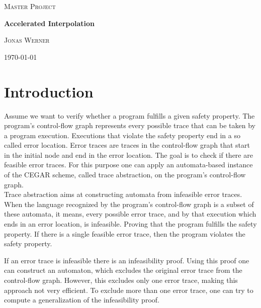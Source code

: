 \documentclass{article}
\begin{document}
	\newcommand{\HorizontalLine}{\rule{\linewidth}{0.3mm}}
	
		\begin{center}
		{\scshape\Large Master Project \par}
		\vspace{1.5cm}
		{\huge\bfseries Accelerated Interpolation \par}
		\vspace{1cm}
		{\large \scshape Jonas Werner\par}
		\vspace{0.5cm}
		{\today \vspace{2cm}} 
		
		\end{center}

\section{Introduction}
Assume we want to verify whether a program fulfills a given safety property. The program's control-flow graph represents every possible trace that can be taken by a program execution. Executions that violate the safety property end in a so called error location. Error traces are traces in the control-flow graph that start in the initial node and end in the error location. The goal is to check if there are feasible error traces.
For this purpose one can apply an automata-based instance of the CEGAR scheme, called trace abstraction, on the program's control-flow graph. \\

Trace abstraction aims at constructing automata \cite{10.1007/978-3-642-39799-8_2} from infeasible error traces. When the language recognized by the program's control-flow graph is a subset of these automata, it means, every possible error trace, and by that execution which ends in an error location, is infeasible. Proving that the program fulfills the safety property. If there is a single feasible error trace, then the program violates the safety property.\\
\par 
If an error trace is infeasible there is an infeasibility proof. Using this proof one can construct an automaton, which excludes the original error trace from the control-flow graph. However, this excludes only one error trace, making this approach not very efficient. To exclude more than one error trace, one can try to compute a generalization of the infeasibility proof. \par
\end{document}
